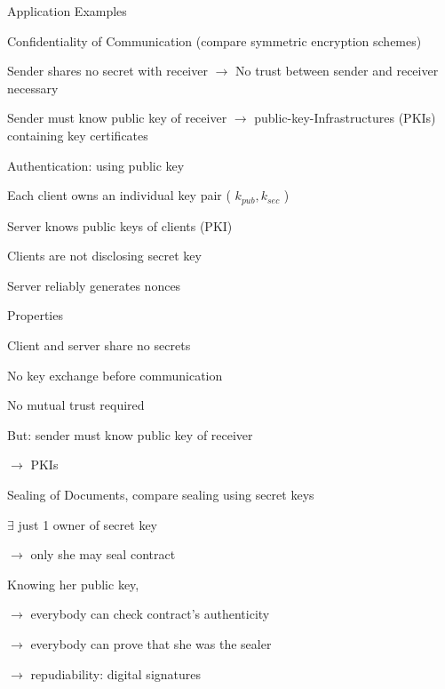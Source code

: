 \documentclass[a4paper]{article}
\begin{document}
\begin{multicols}{3}
    Application Examples
    \begin{enumerate*}
        \item Confidentiality of Communication (compare symmetric encryption schemes)
        \begin{itemize*}
            \item Sender shares no secret with receiver $\rightarrow$ No trust between sender and receiver necessary
            \item Sender must know public key of receiver $\rightarrow$ public-key-Infrastructures (PKIs) containing key certificates
        \end{itemize*}
        \item Authentication: using public key
        \begin{itemize*}
            \item Each client owns an individual key pair ( $k_{pub}, k_{sec}$ )
            \item Server knows public keys of clients (PKI)
            \item Clients are not disclosing secret key
            \item Server reliably generates nonces
            \item Properties
            \begin{itemize*}
                \item Client and server share no secrets
                \item No key exchange before communication
                \item No mutual trust required
                \item But: sender must know public key of receiver
                \item[$\rightarrow$] PKIs
            \end{itemize*}
        \end{itemize*}
        \item Sealing of Documents, compare sealing using secret keys
        \begin{itemize*}
            \item $\exists$ just 1 owner of secret key
            \item[$\rightarrow$] only she may seal contract
            \item Knowing her public key,
            \begin{itemize*}
                \item[$\rightarrow$] everybody can check contract’s authenticity
                \item[$\rightarrow$] everybody can prove that she was the sealer
                \item[$\rightarrow$] repudiability: digital signatures
            \end{itemize*}
        \end{itemize*}
    \end{enumerate*}


\end{multicols}
\end{document}
